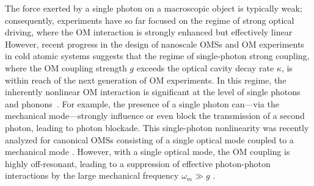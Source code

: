  
The force exerted by a single photon on a macroscopic
object is typically weak; consequently,
experiments have so far 
focused on the regime of strong optical driving, where
the OM interaction
is strongly enhanced but effectively linear
\cite{Groblacher2009,Teufel2011a}
However, recent progress in the design of nanoscale OMSs
\cite{Chan2011,Eichenfield2009, Carmon2007, Ding2011}
and OM experiments in
cold atomic systems 
\cite{Gupta2007, Brennecke2008} 
suggests that the regime of single-photon 
strong coupling, where
the OM coupling strength $g$ exceeds the optical
cavity decay rate 
$\kappa$, is within reach of the
next generation of OM experiments.
In this regime, the inherently nonlinear OM interaction
is significant at the level of single photons and phonons~\cite{Marshall2003,
Ludwig2008, Rabl2011, Nunnenkamp2011}. 
For example, the presence of
a single photon can---via
the mechanical mode---strongly influence or even
block 
the transmission of a second photon, leading to
photon blockade.
This single-photon nonlinearity   was recently
analyzed for canonical OMSs consisting of a single
optical mode coupled to a mechanical mode 
\cite{Rabl2011,Kronwald2012,Liao2012}.
However, with a single optical mode, 
the OM coupling is highly off-resonant, 
leading to a
suppression of effective 
photon-photon interactions by the large mechanical
frequency $\omega_m \gg g$ \cite{Rabl2011}.



